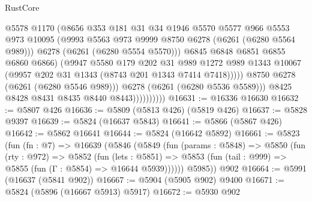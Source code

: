 \begin{lexlean}{RustCore}
\begin{coremodule}
                                  @5578
                                  @1170
                                  (@8656
                                    @353
                                    @181
                                    @31
                                    @34
                                    @1946
                                    @5570
                                    @5577
                                    @966
                                    @5553
                                    @973
                                    @10095
                                    (@9993 @5563 @973 @9999 @8750 @6278 (@6261 (@6280 @5564 @989)))
                                    @6278
                                    (@6261 (@6280 @5554 @5570)))
                                  @6845
                                  @6848
                                  @6851
                                  @6855
                                  @6860
                                  @6866)
                                (@9947
                                  @5580
                                  @179
                                  @202
                                  @31
                                  @989
                                  @1272
                                  @989
                                  @1343
                                  @10067
                                  (@9957 @202 @31 @1343 (@8743 @201 @1343 @7414 @7418)))))
                            @8750
                            @6278
                            (@6261 (@6280 @5546 @989)))
                          @6278
                          (@6261 (@6280 @5536 @5589)))
                        @8425
                        @8428
                        @8431
                        @8435
                        @8440
                        @8443))))))))))
@16631 := @16336 @16630
@16632 := @5807 @426
@16636 := @5809 (@5813 @426) (@5819 @426)
@16637 := @5828 @9397
@16639 := @5824 (@16637 @5843)
@16641 := @5866 (@5867 @426)
@16642 := @5862 @16641
@16644 := @5824 (@16642 @5892)
@16661 := @5823
    (fun (fn : @7) =>
    @16639
      (@5846
        (@5849
          (fun (params : @5848) =>
          @5850
            (fun (rty : @972) =>
            @5852
              (fun (lets : @5851) =>
              @5853 (fun (tail : @999) => @5855 (fun (Γ : @5854) => @16644 @5939))))))
        @5985))
    @902
@16664 := @5991 (@16637 (@5841 @902))
@16667 := @5904 (@5905 @902) @9400
@16671 := @5824 (@5896 (@16667 @5913) @5917)
@16672 := @5930 @902

\end{coremodule}
\end{lexlean}
